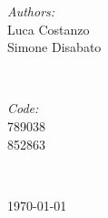 \documentclass[12pt]{report}
\begin{document}
\begin{titlepage}
\begin{flushleft}
\begin{minipage}{0.45\textwidth}
\begin{flushleft} \large
\emph{Authors:}\\
Luca Costanzo\\
Simone Disabato
\end{flushleft}
\end{minipage}
~
\begin{minipage}{0.45\textwidth}
\begin{flushright} \large
\emph{Code:} \\
789038\\
852863
\end{flushright}
\end{minipage}\\[1 cm]

\end{flushleft} 

{\large \today}\\ %


\vfill %

\end{titlepage}
\newpage


\tableofcontents %

\newpage %




%
%
%

\end{document}
